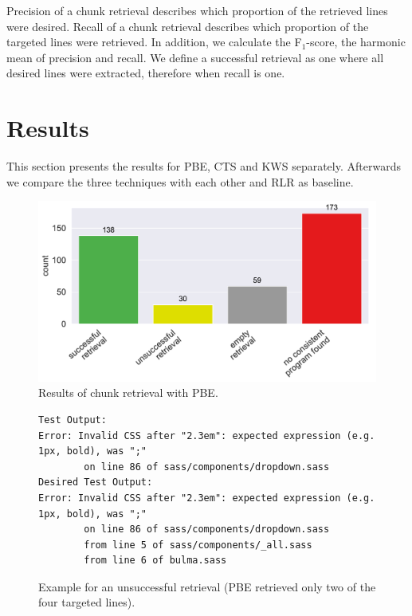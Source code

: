 Precision of a chunk retrieval describes which proportion of the retrieved lines were desired.
Recall of a chunk retrieval describes which proportion of the targeted lines were retrieved.
In addition, we calculate the F$_{1}$-score, the harmonic mean of precision and recall.
We define a successful retrieval as one where all desired lines were extracted, therefore when recall is one.



\section{Results}
This section presents the results for PBE, CTS and KWS separately.
Afterwards we compare the three techniques with each other and RLR as baseline.

\begin{figure}[!t]
		\centering
		\includegraphics[width=0.75\columnwidth, clip]{img/big-study/failure-reason-PBE.pdf}
		\caption{Results of chunk retrieval with PBE.}
		\label{fig:failure-reason-PBE}
\end{figure}

\begin{figure}[!t]
  \centering
  \begin{lstlisting}[breaklines=true]
Test Output:
Error: Invalid CSS after "2.3em": expected expression (e.g. 1px, bold), was ";"
        on line 86 of sass/components/dropdown.sass   
Desired Test Output:
Error: Invalid CSS after "2.3em": expected expression (e.g. 1px, bold), was ";"
        on line 86 of sass/components/dropdown.sass
        from line 5 of sass/components/_all.sass
        from line 6 of bulma.sass
  \end{lstlisting}  
  \caption{Example for an unsuccessful retrieval (PBE retrieved only two of the four targeted lines).}
  \label{lst:pbe-unsuccessful}
\end{figure}


